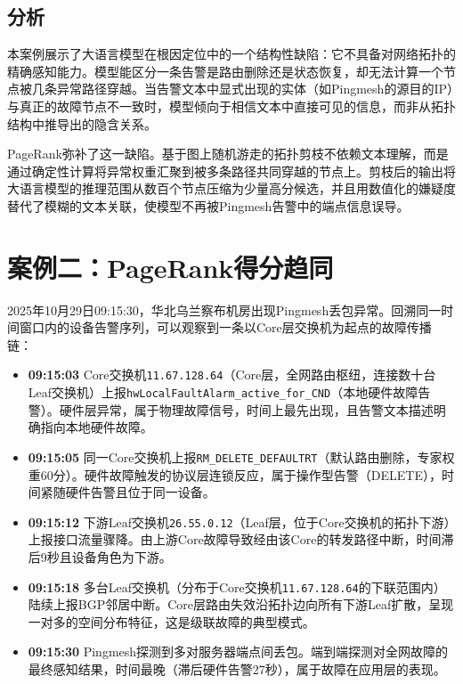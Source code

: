 \subsection{分析}

本案例展示了大语言模型在根因定位中的一个结构性缺陷：它不具备对网络拓扑的精确感知能力。模型能区分一条告警是路由删除还是状态恢复，却无法计算一个节点被几条异常路径穿越。当告警文本中显式出现的实体（如Pingmesh的源目的IP）与真正的故障节点不一致时，模型倾向于相信文本中直接可见的信息，而非从拓扑结构中推导出的隐含关系。

PageRank弥补了这一缺陷。基于图上随机游走的拓扑剪枝不依赖文本理解，而是通过确定性计算将异常权重汇聚到被多条路径共同穿越的节点上。剪枝后的输出将大语言模型的推理范围从数百个节点压缩为少量高分候选，并且用数值化的嫌疑度替代了模糊的文本关联，使模型不再被Pingmesh告警中的端点信息误导。

\section{案例二：PageRank得分趋同}

2025年10月29日09:15:30，华北乌兰察布机房出现Pingmesh丢包异常。回溯同一时间窗口内的设备告警序列，可以观察到一条以Core层交换机为起点的故障传播链：

\begin{itemize}
    \item \textbf{09:15:03} \quad Core交换机\texttt{11.67.128.64}（Core层，全网路由枢纽，连接数十台Leaf交换机）上报\texttt{hwLocalFaultAlarm\_active\_for\_CND}（本地硬件故障告警）。硬件层异常，属于物理故障信号，时间上最先出现，且告警文本描述明确指向本地硬件故障。
    \item \textbf{09:15:05} \quad 同一Core交换机上报\texttt{RM\_DELETE\_DEFAULTRT}（默认路由删除，专家权重60分）。硬件故障触发的协议层连锁反应，属于操作型告警（DELETE），时间紧随硬件告警且位于同一设备。
    \item \textbf{09:15:12} \quad 下游Leaf交换机\texttt{26.55.0.12}（Leaf层，位于Core交换机的拓扑下游）上报接口流量骤降。由上游Core故障导致经由该Core的转发路径中断，时间滞后9秒且设备角色为下游。
    \item \textbf{09:15:18} \quad 多台Leaf交换机（分布于Core交换机\texttt{11.67.128.64}的下联范围内）陆续上报BGP邻居中断。Core层路由失效沿拓扑边向所有下游Leaf扩散，呈现一对多的空间分布特征，这是级联故障的典型模式。
    \item \textbf{09:15:30} \quad Pingmesh探测到多对服务器端点间丢包。端到端探测对全网故障的最终感知结果，时间最晚（滞后硬件告警27秒），属于故障在应用层的表现。
\end{itemize}

